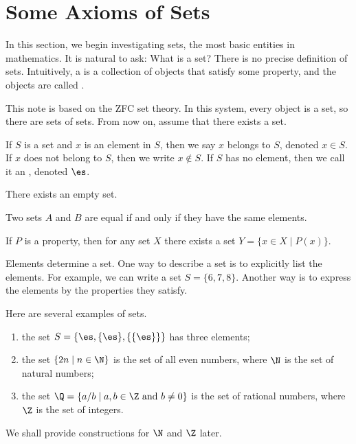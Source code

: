\documentclass[10pt]{article}
\begin{document}
\section{Some Axioms of Sets}
\par
In this section, we begin investigating sets, the most basic entities in mathematics. It is natural to ask: What is a set? There is no precise definition of sets. Intuitively, a  is a collection of objects that satisfy some property, and the objects are called .
\begin{remark}
    This note is based on the ZFC set theory. In this system, every object is a set, so there are sets of sets. From now on, assume that there exists a set.
\end{remark}
\par
If $S$ is a set and $x$ is an element in $S$, then we say $x$ belongs to $S$, denoted $x\in S$. If $x$ does not belong to $S$, then we write $x\notin S$. If $S$ has no element, then we call it an , denoted $\es$.
\begin{Axiom of empty set}
    There exists an empty set.
\end{Axiom of empty set}
\begin{Axiom of extensionality}
    Two sets $A$ and $B$ are equal if and only if they have the same elements.
\end{Axiom of extensionality}
\begin{Axiom schema of separation}
    If $P$ is a property, then for any set $X$ there exists a set $Y=\{x\in X\mid P(x)\}$.
\end{Axiom schema of separation}
\par
Elements determine a set. One way to describe a set is to explicitly list the elements. For example, we can write a set $S=\{6,7,8\}$. Another way is to express the elements by the properties they satisfy.
\begin{example}
    Here are several examples of sets.
    \begin{enumerate}
        \item the set $S=\{\es,\{\es\},\{\{\es\}\}\}$ has three elements;
        \item the set $\{2n\mid n\in\N\}$ is the set of all even numbers, where $\N$ is the set of natural numbers;
        \item the set $\Q=\{a/b\mid a,b\in\Z\ \text{and}\ b\ne 0\}$ is the set of rational numbers, where $\Z$ is the set of integers.
    \end{enumerate}
    We shall provide constructions for $\N$ and $\Z$ later.
\end{example}
\end{document}
